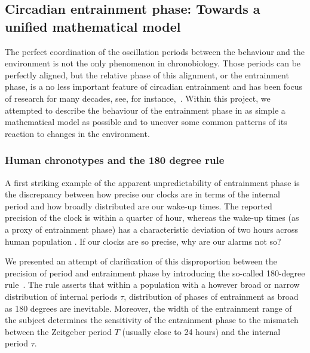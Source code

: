 \subsection{Circadian entrainment phase: Towards a unified mathematical
model}

The perfect coordination of the oscillation periods between the
behaviour and the environment is not the only phenomenon in
chronobiology. Those periods can be perfectly aligned, but the
relative phase of this alignment, or the entrainment phase, is a no
less important feature of circadian entrainment and has been focus of
research for many decades, see, for
instance,~\cite{pittendrigh1981circadian}. Within this project, we
attempted to describe the behaviour of the entrainment phase in as
simple a mathematical model as possible and to uncover some common
patterns of its reaction to changes in the environment.

\subsubsection{Human chronotypes and the 180 degree rule}
A first striking example of the apparent unpredictability of
entrainment phase is the discrepancy between how precise our clocks
are in terms of the internal period and how broadly distributed are
our wake-up times. The reported precision of the clock is within a
quarter of hour, whereas the wake-up times (as a proxy of entrainment
phase) has a characteristic deviation of two hours across human
population \cite{duffy2005entrainment}. If our clocks are so precise,
why are our alarms not so?

We presented an attempt of clarification of this disproportion between
the precision of period and entrainment phase by introducing the
so-called 180-degree rule~\cite{granada2013human}. The rule asserts
that within a population with a however broad or narrow distribution
of internal periods $\tau$, distribution of phases of entrainment as
broad as 180 degrees are inevitable. Moreover, the width of the
entrainment range of the subject determines the sensitivity of the
entrainment phase to the mismatch between the Zeitgeber period $T$
(usually close to 24 hours) and the internal period $\tau$.

